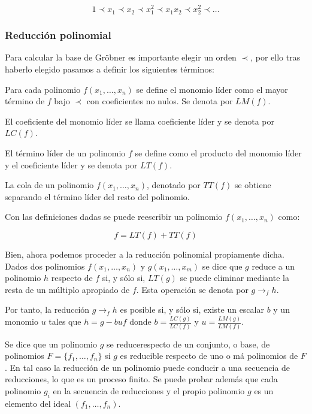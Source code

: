 $$1 \prec x_1 \prec x_2  \prec x_1^2 \prec x_1 x_2 \prec x_2^2 \prec \dotso$$

\subsubsection*{Reducción polinomial}

Para calcular la base de Gröbner es importante elegir un orden $\prec$, por ello tras haberlo elegido pasamos a definir los siguientes términos:

\begin{definition}
Para cada polinomio $f(x_1, \dotso, x_n)$ se define el monomio líder como el mayor término de $f$ bajo $\prec$ con coeficientes no nulos. Se denota por $LM(f)$.
\end{definition}

\begin{remark}
El coeficiente del monomio líder se llama coeficiente líder y se denota por $LC(f)$.
\end{remark}

\begin{definition}
El término líder de un polinomio $f$ se define como el producto del monomio líder y el coeficiente líder y se denota por $LT(f)$.
\end{definition}

\begin{definition}
La cola de un polinomio $f(x_1, \dotso, x_n)$, denotado por $TT(f)$ se obtiene separando el término líder del resto del polinomio.
\end{definition}

Con las definiciones dadas se puede reescribir un polinomio $f(x_1, \dotso, x_n)$ como:

$$f = LT(f) + TT(f)$$

Bien, ahora podemos proceder a la reducción polinomial propiamente dicha. Dados dos polinomios $f(x_1, \dotso, x_n)$ y $g(x_1, \dotso, x_m)$ se dice que $g$ reduce a un polinomio $h$ respecto de $f$ si, y sólo si, $LT(g)$ se puede eliminar mediante la resta de un múltiplo apropiado de $f$. Esta operación se denota por $g \to_f h$.
\par
Por tanto, la reducción $g \to_f h$ es posible si, y sólo si, existe un escalar $b$ y un monomio $u$ tales que $h = g - buf$ donde $b = \frac{LC(g)}{LC(f)}$ y $u =\frac{LM(g)}{LM(f)}$.
\par
Se dice que un polinomio $g$ se reducerespecto de un conjunto, o base, de polinomios $F = \{ f_1, \dotso, f_n \}$ si $g$ es reducible respecto de uno o má polinomios de $F$. En tal caso la reducción de un polinomio puede conducir a una secuencia de reducciones, lo que es un proceso finito. Se puede probar además que cada polinomio $g_i$ en la secuencia de reducciones y el propio polinomio $g$ es un elemento del ideal $(f_1, \dotso, f_n)$.

